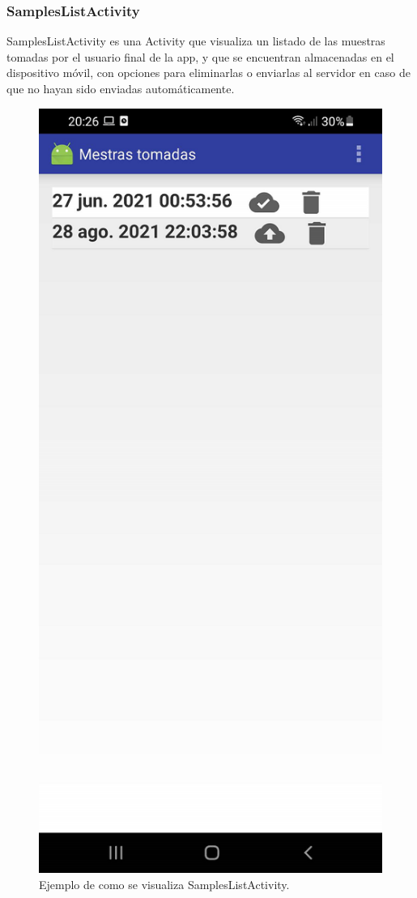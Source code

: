\subsubsection{SamplesListActivity}
SamplesListActivity es una Activity que visualiza un listado de las muestras tomadas por el usuario final de la app, y que se encuentran almacenadas en el dispositivo móvil, con opciones para eliminarlas o enviarlas al servidor en caso de que no hayan sido enviadas automáticamente.

\begin{figure}[H]
  \centering
    \includegraphics[scale=0.3]{05-implementacion/SamplesListActivity.png} 
   \caption{Ejemplo de como se visualiza SamplesListActivity.}
\end{figure}	


